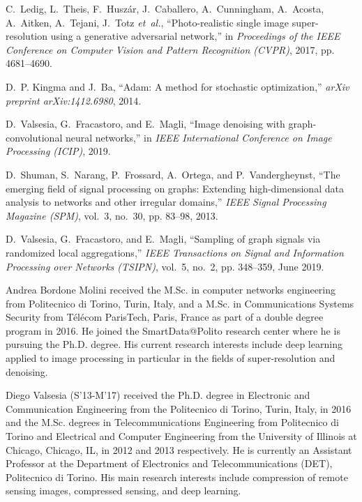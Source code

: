 \documentclass[journal]{IEEEtran}
\begin{document}
\begin{thebibliography}{10}
C.~Ledig, L.~Theis, F.~Husz{\'a}r, J.~Caballero, A.~Cunningham, A.~Acosta,
  A.~Aitken, A.~Tejani, J.~Totz \emph{et~al.}, ``Photo-realistic single image
  super-resolution using a generative adversarial network,'' in
  \emph{{Proceedings of the IEEE Conference on Computer Vision and Pattern
  Recognition (CVPR)}}, 2017, pp. 4681--4690.

D.~P. Kingma and J.~Ba, ``Adam: A method for stochastic optimization,''
  \emph{arXiv preprint arXiv:1412.6980}, 2014.

D.~Valsesia, G.~Fracastoro, and E.~Magli, ``Image denoising with
  graph-convolutional neural networks,'' in \emph{IEEE International Conference
  on Image Processing (ICIP)}, 2019.

D.~Shuman, S.~Narang, P.~Frossard, A.~Ortega, and P.~Vandergheynst, ``The
  emerging field of signal processing on graphs: Extending high-dimensional
  data analysis to networks and other irregular domains,'' \emph{IEEE Signal
  Processing Magazine (SPM)}, vol.~3, no.~30, pp. 83--98, 2013.

D.~{Valsesia}, G.~{Fracastoro}, and E.~{Magli}, ``Sampling of graph signals via
  randomized local aggregations,'' \emph{IEEE Transactions on Signal and
  Information Processing over Networks (TSIPN)}, vol.~5, no.~2, pp. 348--359,
  June 2019.

\end{thebibliography}



\begin{IEEEbiography}{Andrea Bordone Molini} received the M.Sc. in computer networks engineering from Politecnico di Torino, Turin, Italy, and a M.Sc. in Communications Systems Security from T\'el\'ecom ParisTech, Paris, France as part of a double degree program in 2016. He joined the SmartData@Polito research center where he is pursuing the Ph.D. degree. His current research interests include deep learning applied to image processing in particular in the fields of super-resolution and denoising. \end{IEEEbiography}


\begin{IEEEbiography}{Diego Valsesia} (S'13-M'17) received the Ph.D. degree in Electronic and Communication Engineering from the Politecnico di Torino, Turin, Italy, in 2016 and the M.Sc. degrees in Telecommunications Engineering from Politecnico di Torino and Electrical and Computer Engineering from the University of Illinois at Chicago, Chicago, IL, in 2012 and 2013 respectively. He is currently an Assistant Professor at the Department of Electronics and Telecommunications (DET), Politecnico di Torino. His main research interests include compression of remote sensing images, compressed sensing, and deep learning.\end{IEEEbiography}
\end{document}
